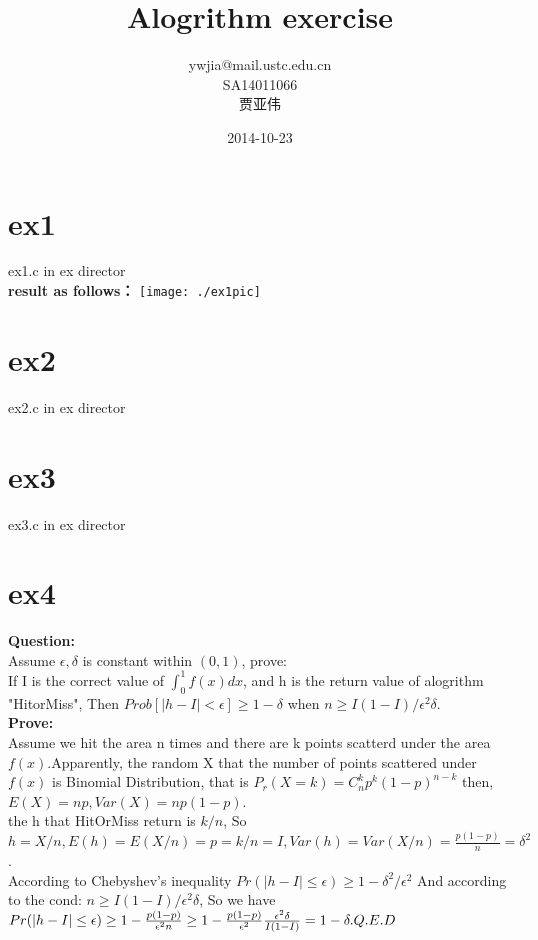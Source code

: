 \documentclass[10pt, a4paper]{article}
\title{\textbf{Alogrithm exercise }}
\author{ywjia@mail.ustc.edu.cn\\
		SA14011066\\
		贾亚伟}
\date{2014-10-23}
\begin{document}
\maketitle
{}


\section{ex1}
ex1.c in ex director \\

\textbf{result as follows：}
\texttt{[image: ./ex1pic]}
\section{ex2}
ex2.c in ex director 



\section{ex3}
ex3.c in ex director


\section{ex4}
\textbf{Question:} \\
Assume $\epsilon, \delta$ is constant within $(0, 1)$, prove: \\
If I is the correct value of $\int_0^1{f(x)dx}$, and h is the return value of alogrithm "HitorMiss", Then $Prob[|h-I| < \epsilon] \geq 1 - \delta$ when $n \geq I(1-I)/\epsilon^{2}\delta$. \\
 \textbf{Prove:}\\
Assume we hit the area n times and there are  k points scatterd under the area $f(x)$.Apparently, the random X that the number of points scattered under $f(x)$ is Binomial Distribution, that is $P_r(X = k) = C_n^{k}p^{k}(1-p)^{n-k}$
then, $E(X) = np, Var(X) = np(1-p)$.\\
the h that HitOrMiss return is $k/n$, So $h = X/n, E(h) = E(X/n) = p = k/n = I, Var(h) = Var(X/n) = \frac{p(1-p)}{n} = \delta^{2}$. \\
According to Chebyshev's inequality $Pr(|h - I| \leq \epsilon) \geq 1 - \delta^{2}/\epsilon^{2} $  And according to the cond: $n \geq I(1-I)/\epsilon^{2}\delta$, So we have $Pr(|h - I| \leq \epsilon )\geq 1 - \frac{p(1-p)}{\epsilon^{2}n} \geq 1 - \frac{p(1-p)}{\epsilon^{2}}\frac{\epsilon^{2}\delta}{I(1-I)} = 1 - \delta.\\
Q.E.D$
\end{document}
